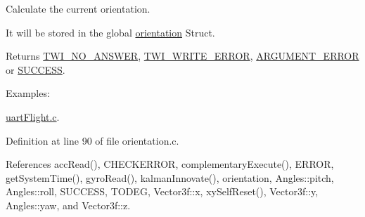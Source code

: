 Calculate the current orientation. 

It will be stored in the global \hyperlink{group__orientation_gacd4a2942520b68691db5aebde4e537a4}{orientation} Struct. \begin{DoxyReturn}{Returns}
\hyperlink{group__error_gga2c3e4bb40f36b262a5214e2da2bca9c5a04d5943ba652af2205c88b247e0c659c}{T\-W\-I\-\_\-\-N\-O\-\_\-\-A\-N\-S\-W\-E\-R}, \hyperlink{group__error_gga2c3e4bb40f36b262a5214e2da2bca9c5ac0e3b3463dcaf220e54794b4711708c9}{T\-W\-I\-\_\-\-W\-R\-I\-T\-E\-\_\-\-E\-R\-R\-O\-R}, \hyperlink{group__error_gga2c3e4bb40f36b262a5214e2da2bca9c5a49ccf277a69dd938c591928aa27c66cc}{A\-R\-G\-U\-M\-E\-N\-T\-\_\-\-E\-R\-R\-O\-R} or \hyperlink{group__error_gga2c3e4bb40f36b262a5214e2da2bca9c5ac7f69f7c9e5aea9b8f54cf02870e2bf8}{S\-U\-C\-C\-E\-S\-S}. 
\end{DoxyReturn}
\begin{Desc}
\item[Examples\-: ]\par
\hyperlink{uart_flight_8c-example}{uart\-Flight.\-c}.\end{Desc}


Definition at line 90 of file orientation.\-c.



References acc\-Read(), C\-H\-E\-C\-K\-E\-R\-R\-O\-R, complementary\-Execute(), E\-R\-R\-O\-R, get\-System\-Time(), gyro\-Read(), kalman\-Innovate(), orientation, Angles\-::pitch, Angles\-::roll, S\-U\-C\-C\-E\-S\-S, T\-O\-D\-E\-G, Vector3f\-::x, xy\-Self\-Reset(), Vector3f\-::y, Angles\-::yaw, and Vector3f\-::z.


